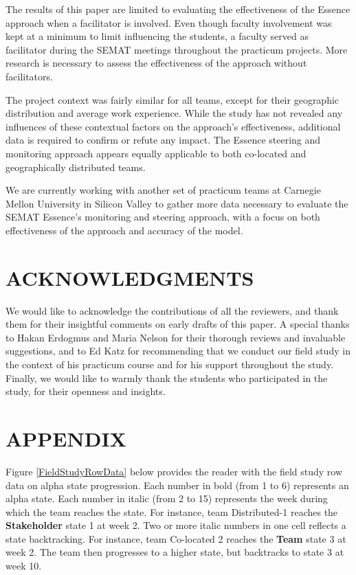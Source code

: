 The results of this paper are limited to evaluating the effectiveness of the Essence approach when a facilitator is involved. Even though faculty involvement was kept at a minimum to limit influencing the students, a faculty served as facilitator during the SEMAT meetings throughout the practicum projects. More research is necessary to assess the effectiveness of the approach without facilitators.

The project context was fairly similar for all teams, except for their geographic distribution and average work experience. While the study has not revealed any influences of these contextual factors on the approach's effectiveness, additional data is required to confirm or refute any impact. The Essence steering and monitoring approach appears equally applicable to both co-located and geographically distributed teams.

We are currently working with another set of practicum teams at Carnegie Mellon University in Silicon Valley to gather more data necessary to evaluate the SEMAT Essence's monitoring and steering approach, with a focus on both effectiveness of the approach and accuracy of the model.

\section{ACKNOWLEDGMENTS}
We would like to acknowledge the contributions of all the reviewers, and thank them for their insightful comments on early drafts of this paper. A special thanks to Hakan Erdogmus and Maria Nelson for their thorough reviews and invaluable suggestions, and to Ed Katz for recommending that we conduct our field study in the context of his practicum course and for his support throughout the study. Finally, we would like to warmly thank the students who participated in the study, for their openness and insights.

\section{APPENDIX}
Figure \ref{FieldStudyRowData} below provides the reader with the field study row data on alpha state progression. Each number in bold (from 1 to 6) represents an alpha state. Each number in italic (from 2 to 15) represents the week during which the team reaches the state. For instance, team Distributed-1 reaches the \textbf{Stakeholder} state 1 at week 2. Two or more italic numbers in one cell reflects a state backtracking. For instance, team Co-located 2 reaches the \textbf{Team} state 3 at week 2. The team then progresses to a higher state, but backtracks to state 3 at week 10.

